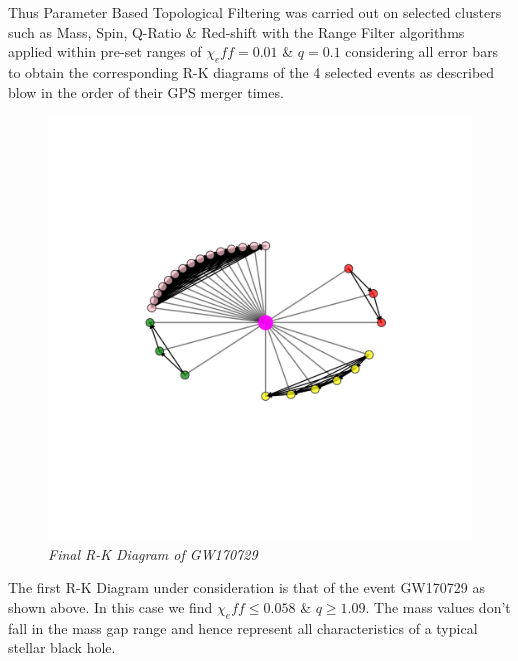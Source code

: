     
Thus Parameter Based Topological Filtering was carried out on selected clusters such as Mass, Spin, Q-Ratio \& Red-shift with the Range Filter algorithms applied within pre-set ranges of $\chi_eff=0.01$ \&  $q=0.1$  \cite{24.7_qvalueestimation} \cite{24.9_EffectiveSpin} \cite{00.6_LIGOAnalysisPipeline}considering all error bars to obtain the corresponding R-K diagrams of the 4 selected events as described blow in the order of their GPS merger times.

    \begin{figure}[H]
        \centering
        \includegraphics[width=1.0\linewidth]{images/GW170729_RK_Diagram.png}
        \caption{\textit{Final R-K Diagram of GW170729}}
        \label{fig:LIGO14_PlaceHolder1_fig}
    \end{figure}

The first R-K Diagram under consideration is that of the event GW170729 as shown above. In this case we find $\chi_eff \le 0.058$ \&  $q\ge 1.09$. The mass values don't fall in the mass gap range and hence represent all characteristics of a typical stellar black hole.


